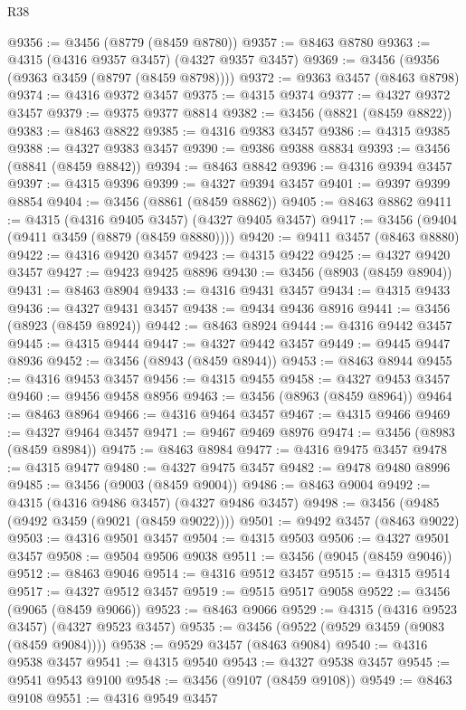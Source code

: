 \begin{lexlean}{R38}
\begin{coremodule}
@9356 := @3456 (@8779 (@8459 @8780))
@9357 := @8463 @8780
@9363 := @4315 (@4316 @9357 @3457) (@4327 @9357 @3457)
@9369 := @3456 (@9356 (@9363 @3459 (@8797 (@8459 @8798))))
@9372 := @9363 @3457 (@8463 @8798)
@9374 := @4316 @9372 @3457
@9375 := @4315 @9374
@9377 := @4327 @9372 @3457
@9379 := @9375 @9377 @8814
@9382 := @3456 (@8821 (@8459 @8822))
@9383 := @8463 @8822
@9385 := @4316 @9383 @3457
@9386 := @4315 @9385
@9388 := @4327 @9383 @3457
@9390 := @9386 @9388 @8834
@9393 := @3456 (@8841 (@8459 @8842))
@9394 := @8463 @8842
@9396 := @4316 @9394 @3457
@9397 := @4315 @9396
@9399 := @4327 @9394 @3457
@9401 := @9397 @9399 @8854
@9404 := @3456 (@8861 (@8459 @8862))
@9405 := @8463 @8862
@9411 := @4315 (@4316 @9405 @3457) (@4327 @9405 @3457)
@9417 := @3456 (@9404 (@9411 @3459 (@8879 (@8459 @8880))))
@9420 := @9411 @3457 (@8463 @8880)
@9422 := @4316 @9420 @3457
@9423 := @4315 @9422
@9425 := @4327 @9420 @3457
@9427 := @9423 @9425 @8896
@9430 := @3456 (@8903 (@8459 @8904))
@9431 := @8463 @8904
@9433 := @4316 @9431 @3457
@9434 := @4315 @9433
@9436 := @4327 @9431 @3457
@9438 := @9434 @9436 @8916
@9441 := @3456 (@8923 (@8459 @8924))
@9442 := @8463 @8924
@9444 := @4316 @9442 @3457
@9445 := @4315 @9444
@9447 := @4327 @9442 @3457
@9449 := @9445 @9447 @8936
@9452 := @3456 (@8943 (@8459 @8944))
@9453 := @8463 @8944
@9455 := @4316 @9453 @3457
@9456 := @4315 @9455
@9458 := @4327 @9453 @3457
@9460 := @9456 @9458 @8956
@9463 := @3456 (@8963 (@8459 @8964))
@9464 := @8463 @8964
@9466 := @4316 @9464 @3457
@9467 := @4315 @9466
@9469 := @4327 @9464 @3457
@9471 := @9467 @9469 @8976
@9474 := @3456 (@8983 (@8459 @8984))
@9475 := @8463 @8984
@9477 := @4316 @9475 @3457
@9478 := @4315 @9477
@9480 := @4327 @9475 @3457
@9482 := @9478 @9480 @8996
@9485 := @3456 (@9003 (@8459 @9004))
@9486 := @8463 @9004
@9492 := @4315 (@4316 @9486 @3457) (@4327 @9486 @3457)
@9498 := @3456 (@9485 (@9492 @3459 (@9021 (@8459 @9022))))
@9501 := @9492 @3457 (@8463 @9022)
@9503 := @4316 @9501 @3457
@9504 := @4315 @9503
@9506 := @4327 @9501 @3457
@9508 := @9504 @9506 @9038
@9511 := @3456 (@9045 (@8459 @9046))
@9512 := @8463 @9046
@9514 := @4316 @9512 @3457
@9515 := @4315 @9514
@9517 := @4327 @9512 @3457
@9519 := @9515 @9517 @9058
@9522 := @3456 (@9065 (@8459 @9066))
@9523 := @8463 @9066
@9529 := @4315 (@4316 @9523 @3457) (@4327 @9523 @3457)
@9535 := @3456 (@9522 (@9529 @3459 (@9083 (@8459 @9084))))
@9538 := @9529 @3457 (@8463 @9084)
@9540 := @4316 @9538 @3457
@9541 := @4315 @9540
@9543 := @4327 @9538 @3457
@9545 := @9541 @9543 @9100
@9548 := @3456 (@9107 (@8459 @9108))
@9549 := @8463 @9108
@9551 := @4316 @9549 @3457

\end{coremodule}
\end{lexlean}
